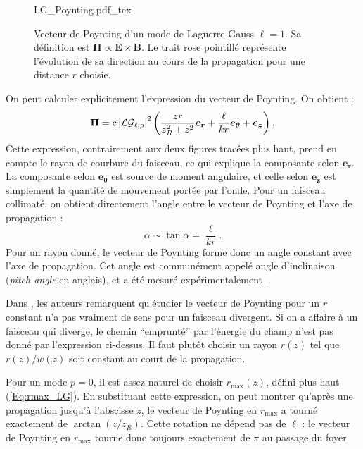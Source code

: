 \begin{figure}[!ht]
\centering
\def\svgwidth{0.7\columnwidth}
{LG_Poynting.pdf_tex}
\caption{Vecteur de Poynting d'un mode de Laguerre-Gauss $\ell=1$. Sa définition est $\bm{\Pi} \propto \bm{E}\times\bm{B}$. Le trait rose pointillé représente l'évolution de sa direction au cours de la propagation pour une distance $r$ choisie.}
\label{Fig:LGPoynting}
\end{figure}

On peut calculer explicitement l'expression du vecteur de Poynting. On obtient  :
\begin{equation*}
\bm{\Pi} = \mathrm{c}\left|\mathcal{LG}_{\ell,p}\right|^2\left(\frac{zr}{z_R^2+z^2}\bm{e_r}+\frac{\ell}{kr}\bm{e_\theta}+\bm{e_z}\right).
\end{equation*}
Cette expression, contrairement aux deux figures tracées plus haut, prend en compte le rayon de courbure du faisceau, ce qui explique la composante selon $\bm{e_r}$. La composante selon $\bm{e_\theta}$ est source de moment angulaire, et celle selon $\bm{e_z}$ est simplement la quantité de mouvement portée par l'onde. Pour un faisceau collimaté, on obtient directement l'angle entre le vecteur de Poynting et l'axe de propagation :
\begin{equation*}
\alpha \sim \tan{\alpha} = \frac{\ell}{kr}.
\end{equation*}
Pour un rayon donné, le vecteur de Poynting forme donc un angle constant avec l'axe de propagation. Cet angle est communément appelé angle d'inclinaison (\textit{pitch angle} en anglais), et a été mesuré expérimentalement .\par
Dans , les auteurs remarquent qu'étudier le vecteur de Poynting pour un $r$ constant n'a pas vraiment de sens pour un faisceau divergent. Si on a affaire à un faisceau qui diverge, le chemin ``emprunté'' par l'énergie du champ n'est pas donné par l'expression ci-dessus. Il faut plutôt choisir un rayon $r(z)$ tel que $r(z)/w(z)$ soit constant au court de la propagation.\par
Pour un mode $p=0$, il est assez naturel de choisir $r_\mathrm{max}(z)$, défini plus haut (\ref{Eq:rmax_LG}). En substituant cette expression, on peut montrer  qu'après une propagation jusqu'à l'abscisse $z$, le vecteur de Poynting en $r_\mathrm{max}$ a tourné exactement de $\arctan{(z/z_R)}$. Cette rotation ne dépend pas de $\ell$ : le vecteur de Poynting en $r_\mathrm{max}$ tourne donc toujours exactement de $\pi$ au passage du foyer. 

